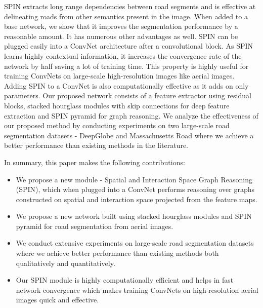 \documentclass[letterpaper, 10 pt, conference]{ieeeconf}
\begin{document}
SPIN extracts long range dependencies between road segments and is effective at delineating roads from other semantics present in the image. When added to a base network, we show that it improves the segmentation performance by a reasonable amount.  It has numerous other advantages as well. SPIN can be plugged easily into a ConvNet architecture after a convolutional block. As SPIN learns highly contextual information, it increases the convergence rate of the network by half saving a lot of training time. This property is highly useful for training ConvNets on large-scale high-resolution images like aerial images. Adding SPIN to a ConvNet is also computationally effective as it adds on only  parameters. Our proposed network consists of a feature extractor using residual blocks, stacked hourglass modules with skip connections for deep feature extraction and SPIN pyramid for graph reasoning. We analyze the effectiveness of our proposed method by conducting experiments on two large-scale road segmentation datasets - DeepGlobe \cite{demir2018deepglobe} and Massachusetts Road \cite{mnih2013machine} where we achieve a better performance than existing methods in the literature.

In summary, this paper makes the following contributions:
\begin{itemize}{}
	\item We propose a new module - Spatial and Interaction Space Graph Reasoning (SPIN), which when plugged into a ConvNet performs reasoning over graphs constructed on spatial and interaction space projected from the feature maps.
	\item We propose a new network built using stacked hourglass modules and SPIN pyramid for road segmentation from aerial images.
	\item We conduct extensive experiments on large-scale road segmentation datasets where we achieve better performance than existing methods both qualitatively and quantitatively.
	\item Our SPIN module is highly computationally efficient and helps in fast network convergence which makes training ConvNets on high-resolution aerial images quick and effective. 
\end{itemize}
\end{document}
